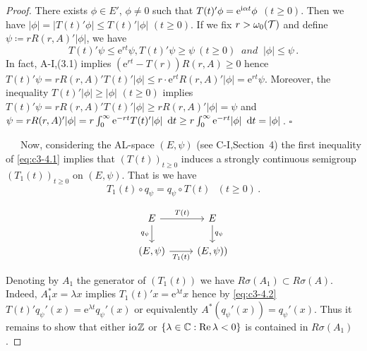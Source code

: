 \begin{proof}
	There exists $\phi \in E'$, $\phi \neq 0$ such that $T(t)'\phi = \mathrm{e}^{\mathrm{i}\alpha t}\phi$ $(t \geq 0)$. 
	Then we have $|\phi| = |T(t)'\phi| \leq T(t)'|\phi|$ $(t \geq 0)$.
	If we fix $r > \omega_0(\mathcal{T})$ and define $\psi \coloneqq  rR(r,A)'|\phi|$, we have
	\begin{equation}\label{eq:c3-4.1}
		T(t)'\psi \leq \mathrm{e}^{rt}\psi, T(t)'\psi \geq \psi \ (t \geq 0) \ \textit{ and } \ |\phi| \leq \psi\,.
	\end{equation}
%
	In fact, A-I,(3.1) implies $(\mathrm{e}^{rt} - T(r))R(r,A) \geq 0$ hence $T(t)'\psi = rR(r,A)'T(t)'|\phi| \leq r\cdot \mathrm{e}^{rt}R(r,A)'|\phi| = \mathrm{e}^{rt}\psi$.
	Moreover, the inequality $T(t)'|\phi| \geq |\phi|$ $(t \geq 0)$ implies $T(t)'\psi = rR(r,A)'T(t)'|\phi| \geq rR(r,A)'|\phi| = \psi$ and $\psi = rR(r,A)'|\phi| = r \int_{0}^{\infty} \mathrm{e}^{-rt}T(t)'|\phi|~\mathop{}\!\mathrm{d}{t}  \geq r\int_{0}^{\infty} \mathrm{e}^{-rt}|\phi|~\mathop{}\!\mathrm{d}{t}  = |\phi|$\,.
	$\square$
	
	\noindent
	\begin{minipage}{0.6\textwidth}
	\ \ \ Now, considering the AL-space $(E,\psi)$ (see C-I,Section~4) the first inequality of \eqref{eq:c3-4.1} implies that $(T(t))_{t \geq 0}$ induces a strongly continuous semigroup $(T_{1}(t))_{t \geq 0}$ on $(E,\psi)$.
	That is we have
	\begin{equation}\label{eq:c3-4.2}
		\textit{$T_{1}(t)\circ q_{\psi} = q_{\psi}\circ T(t)$ $(t \geq 0)$}\,.
	\end{equation}
	\end{minipage}
	\hfill
	\begin{minipage}{0.39\textwidth}
	\[
	\begin{tikzcd}
		E \arrow[r, "T(t)"] \arrow[d, "q_\psi"'] & E \arrow[d, "q_\psi"] \\
		(E,\psi) \arrow[r, "T_1(t)"'] & (E,\psi))
	\end{tikzcd}
	\]
	\end{minipage}
	Denoting by $A_{1}$ the generator of $(T_{1}(t))$ we have $R\sigma(A_{1}) \subset R\sigma(A)$.
	Indeed, $A_{1}^*x = \lambda x$ implies $T_{1}(t)'x = \mathrm{e}^{\lambda t}x$ hence by \eqref{eq:c3-4.2} $T(t)'q_{\psi}'(x) = \mathrm{e}^{\lambda t}q_{\psi}'(x)$ or equivalently $A^*(q_{\psi}'(x)) = q_{\psi}'(x)$. 
	Thus it remains to show that either $\mathrm{i}\alpha\mathbb{Z}$ or $\{\lambda \in \mathbb{C}  : \mathop{}\!\mathrm{Re}\,\lambda < 0 \}$ is contained in $R\sigma(A_{1})$. 
	

\end{proof}
